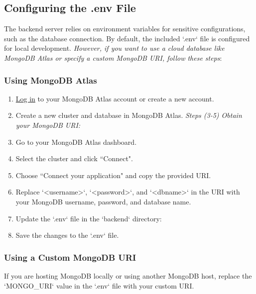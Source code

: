 \documentclass[10pt,twocolumn]{article}
\begin{document}
\subsection{Configuring the .env File}
The backend server relies on environment variables for sensitive configurations, such as the database connection. By default, the included `.env` file is configured for local development. \textit{However, if you want to use a cloud database like MongoDB Atlas or specify a custom MongoDB URI, follow these steps}:
\subsubsection{Using MongoDB Atlas}
\begin{enumerate}
    \item \hyperlink{https://www.mongodb.com/lp/cloud/atlas/try4-reg?utm_source=google&utm_campaign=search_gs_pl_evergreen_atlas_core-high-int_prosp-brand_gic-null_amers-us_ps-all_desktop_eng_lead&utm_term=mongodb\%20atlas&utm_medium=cpc_paid_search&utm_ad=e&utm_ad_campaign_id=19609124046&adgroup=145188748043&cq_cmp=19609124046&gad_source=1&gclid=Cj0KCQiAu8W6BhC-ARIsACEQoDCQRPEQbJ31DNbgJoK7RymGNc-6ZWI_bCXRAjLAmedXJM_Tcamwzo0aAiiQEALw_wcB}{Log in}  to your MongoDB Atlas account or create a new account. 
    \item Create a new cluster and database in MongoDB Atlas.
\textit{Steps (3-5) Obtain your MongoDB URI:}
        \item Go to your MongoDB Atlas dashboard.
        \item Select the cluster and click ``Connect".
        \item Choose ``Connect your application" and copy the provided URI.
        \item Replace `<username>`, `<password>`, and `<dbname>` in the URI with your MongoDB username, password, and database name.
    \item Update the `.env` file in the `backend` directory:
\item Save the changes to the `.env` file.
\end{enumerate}

\subsubsection{Using a Custom MongoDB URI}
If you are hosting MongoDB locally or using another MongoDB host, replace the `MONGO\_URI` value in the `.env` file with your custom URI.
\end{document}
